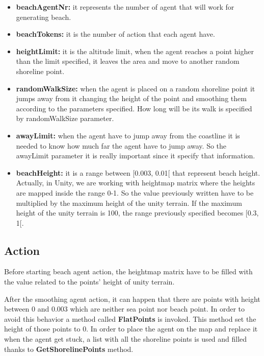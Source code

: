 \documentclass[12pt]{article}
\begin{document}
    \begin{itemize}
        \item \textbf{beachAgentNr:} it represents the number of agent that will work for generating beach.
        \item \textbf{beachTokens:} it is the number of action that each agent have.
        \item \textbf{heightLimit:} it is the altitude limit, when the agent reaches a point higher than the limit specified, it leaves the area
        and move to another random shoreline point.
        \item \textbf{randomWalkSize:} when the agent is placed on a random shoreline point it jumps away from it changing the height of
        the point and smoothing them according to the parameters specified. How long will be its walk is specified by randomWalkSize parameter.
        \item \textbf{awayLimit:} when the agent have to jump away from the coastline it is needed to know how much far the agent have to jump away.
        So the awayLimit parameter it is really important since it specify that information.
        \item \textbf{beachHeight:} it is a range between [0.003, 0.01[ that represent beach height. Actually, in Unity, we are working with heightmap
        matrix where the heights are mapped inside the range 0-1. So the value previously written have to be multiplied by the maximum height of the 
        unity terrain. If the maximum height of the unity terrain is 100, the range previously specified becomes [0.3, 1[.
    \end{itemize}

    \subsection{Action}
    Before starting beach agent action, the heightmap matrix have to be filled with the value related to the points' height of unity terrain.
    
    \noindent
    After the smoothing agent action, it can happen that there are points with height between 0 and 0.003 which are neither sea point nor beach point. In 
    order to avoid this behavior a method called \textbf{FlatPoints} is invoked. This method set the height of those points to 0.
    In order to place the agent on the map and replace it when the agent get stuck, a list with all the shoreline points is used and filled thanks to \textbf{GetShorelinePoints}
    method.
    
\end{document}
